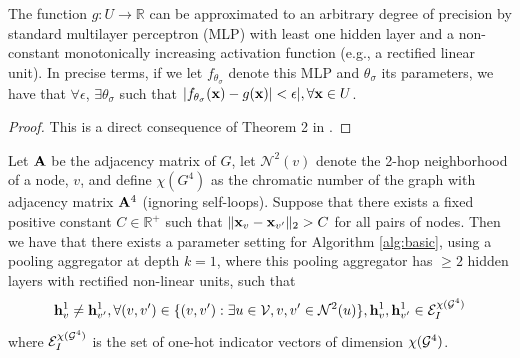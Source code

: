 \begin{lemma}
The function $g : U \rightarrow \mathbb{R}$ can be approximated to an arbitrary degree of precision by standard multilayer perceptron (MLP) with least one hidden layer and a non-constant monotonically increasing activation function (e.g., a rectified linear unit).  In precise terms, if we let $f_{\theta_\sigma}$ denote this MLP and $\theta_\sigma$ its parameters, we have that $\forall \epsilon$, $\exists \theta_\sigma$ such that 
$|f_{\theta_\sigma}(\mathbf{x}) - g(\mathbf{x})| < \epsilon|, \forall \mathbf{x} \in U$.
\end{lemma}
\begin{proof}
This is a direct consequence of Theorem 2 in \cite{hornik1991approximation}.
\end{proof}

\begin{lemma}
Let $\mathbf{A}$ be the adjacency matrix of $G$, let $\mathcal{N}^2(v)$ denote the 2-hop neighborhood of a node, $v$, and define $\chi(G^4)$ as the chromatic number of the graph with adjacency matrix $\mathbf{A}^4$ (ignoring self-loops). Suppose that there exists a fixed positive constant $C \in \mathbb{R}^+$ such that $\|\mathbf{x}_v  - \mathbf{x}_{v'}\|_2 > C$ for all pairs of nodes. Then we have that there exists a parameter setting for Algorithm \ref{alg:basic}, using a pooling aggregator at depth $k=1$, where this pooling aggregator has $\geq 2$ hidden layers with rectified non-linear units, such that 
$$\mathbf{h}^1_v \neq \mathbf{h}^1_{v'}, \forall (v,v') \in \{(v,v') : \exists u \in \mathcal{V}, v,v' \in \mathcal{N}^2(u)\}, \mathbf{h}^1_v, \mathbf{h}^1_{v'} \in \mathcal{E}^{\chi(\mathcal{G}^4)}_I$$
where $\mathcal{E}^{\chi(\mathcal{G}^4)}_I$ is the set of one-hot indicator vectors of dimension $\mathcal{\chi}(\mathcal{G}^4)$.
\end{lemma}
